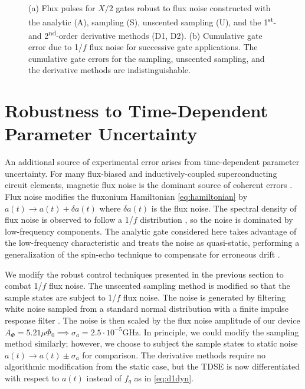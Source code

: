 \documentclass[
  amsfonts,
  amsmath,
  amssymb,
  pra,
  twocolumn,
  superscriptaddress,
]{revtex4-2}
\begin{document}
\begin{figure}[ht]
\begin{subfigure}{.4\textwidth}
        \caption{}
    \label{fig:stochasticb}
  \end{subfigure}
  \caption{
    (a) Flux pulses for $X/2$ gates robust to flux noise
    constructed with the analytic (A),
    sampling (S), unscented sampling (U), and the 1\textsuperscript{st}-
    and 2\textsuperscript{nd}-order derivative methods (D1, D2).
    (b) Cumulative gate error due to 1/$f$ flux noise for
    successive gate applications. The cumulative gate errors for the
    sampling, unscented sampling, and the derivative methods are indistinguishable.
  }
  \label{fig:stochastic}
\end{figure}

\section{Robustness to Time-Dependent Parameter Uncertainty \label{sec:stochastic}}
An additional source of experimental error arises from time-dependent
parameter uncertainty. For many flux-biased and inductively-coupled
superconducting circuit elements, magnetic flux noise is the dominant
source of coherent errors \cite{bialczak20071f, kakuyanagi2007dephasing,
  kumar2016origin, yoshihara2006decoherence}. Flux noise
modifies the fluxonium Hamiltonian \eqref{eq:hamiltonian}
by $a(t) \rightarrow a(t) + \delta a(t)$ where $\delta a(t)$ is the flux noise.
The spectral density of flux noise is observed to
follow a 1/$f$ distribution
\cite{bialczak20071f, koch2007model, kakuyanagi2007dephasing,
  kumar2016origin, yoshihara2006decoherence, yoshihara2010correlated,
  zhang2020universal},
so the noise is dominated by low-frequency components.
The analytic gate considered here
takes advantage of the low-frequency characteristic and
treats the noise as quasi-static, performing a generalization of the spin-echo
technique to compensate for erroneous drift \cite{hahn1952spin, meiboom1958modified}.

We modify the robust control techniques presented
in the previous section to combat 1/$f$ flux noise.
The unscented sampling method is modified so that the sample states
are subject to 1/$f$ flux noise. The noise
is generated by filtering white noise sampled from a standard
normal distribution with a finite impulse response filter \cite{saspweb2011}.
The noise is then scaled by the 
flux noise amplitude of our device $A_{\Phi} = 5.21 \mu \Phi_{0} \implies
\sigma_{a} = 2.5 \cdot 10^{-5} \textrm{GHz}$.
In principle, we could modify the sampling method
similarly; however, we choose to subject the sample states
to static noise
$a(t) \rightarrow a(t) \pm \sigma_{a}$
for comparison. The derivative methods require no algorithmic modification
from the static case, but the TDSE is now differentiated with respect
to $a(t)$ instead of $f_{q}$ as in \eqref{eq:d1dyn}.
\end{document}

